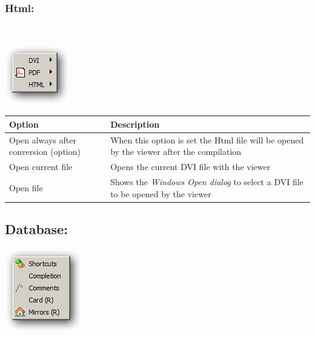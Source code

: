 \hypertarget{menu_tools_processing_viewer_html}{}
\subsubsection{Html:}\\

\includegraphics[scale=0.50]{./res/menu_tools_processing_viewer.png}\\

\begin{scriptsize}\begin{tabularx}{\textwidth}{>{\hsize=0.7\hsize}X>{\hsize=0.7\hsize}X}\\
    \hline
    \textbf{Option} & \textbf{Description} \\
    \hline
    Open always after conversion (option) & When this option is set the Html file will be opened by the viewer after the compilation \\
    Open current file & Opens the current DVI file with the viewer \\
    Open file & Shows the \textit{Windows Open dialog} to select a DVI file to be opened by the viewer \\
    \hline
  \end{tabularx}\end{scriptsize}


\hypertarget{menu_tools_database}{}
\subsection{Database:}

\includegraphics[scale=0.50]{./res/menu_tools_database.png}\\

